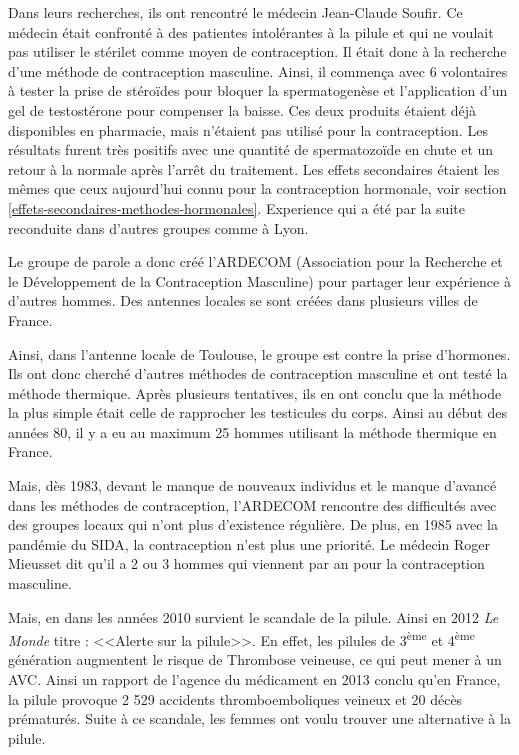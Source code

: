 \documentclass[12pt,a4paper]{report}
\begin{document}
Dans leurs recherches, ils ont rencontré le médecin Jean-Claude Soufir. \cites{guillaumedaudinContraceptesEnqueteDernier2022}{HistoriqueArdecom}
Ce médecin était confronté à des patientes intolérantes à la pilule et qui ne voulait pas utiliser le stérilet comme moyen de contraception.
Il était donc à la recherche d'une méthode de contraception masculine.
Ainsi, il commença avec 6 volontaires à tester la prise de stéroïdes pour bloquer la spermatogenèse et l'application d'un gel de testostérone pour compenser la baisse.
Ces deux produits étaient déjà disponibles en pharmacie, mais n'étaient pas utilisé pour la contraception. \cites{soufirReversibleInhibitionSperm1983}{bobikaCoeurZobs2022}
Les résultats furent très positifs avec une quantité de spermatozoïde en chute et un retour à la normale après l'arrêt du traitement.
Les effets secondaires étaient les mêmes que ceux aujourd'hui connu pour la contraception hormonale, voir section \ref{effets-secondaires-methodes-hormonales}. \cite{soufirReversibleInhibitionSperm1983}
Experience qui a été par la suite reconduite dans d'autres groupes comme à Lyon. \cite{ContraceptionSeDecline1982}

Le groupe de parole a donc créé l'ARDECOM (Association pour la Recherche et le Développement de la Contraception Masculine) pour partager leur expérience à d'autres hommes.
Des antennes locales se sont créées dans plusieurs villes de France. \cites{HistoriqueArdecom}{guillaumedaudinContraceptesEnqueteDernier2022}

Ainsi, dans l'antenne locale de Toulouse, le groupe est contre la prise d'hormones.
Ils ont donc cherché d'autres méthodes de contraception masculine et ont testé la méthode thermique.
Après plusieurs tentatives, ils en ont conclu que la méthode la plus simple était celle de rapprocher les testicules du corps. \cite{bobikaCoeurZobs2022}
Ainsi au début des années 80, il y a eu au maximum 25 hommes utilisant la méthode thermique en France. \cite{guillaumedaudinContraceptesEnqueteDernier2022}

Mais, dès 1983, devant le manque de nouveaux individus et le manque d'avancé dans les méthodes de contraception, l'ARDECOM rencontre des difficultés avec des groupes locaux qui n'ont plus d'existence régulière.
De plus, en 1985 avec la pandémie du SIDA, la contraception n'est plus une priorité.
Le médecin Roger Mieusset dit qu'il a 2 ou 3 hommes qui viennent par an pour la contraception masculine. \cite{guillaumedaudinContraceptesEnqueteDernier2022}

Mais, en dans les années 2010 survient le scandale de la pilule. Ainsi en 2012 \textit{Le Monde} titre : <<Alerte sur la pilule>>.
En effet, les pilules de 3\textsuperscript{ème} et 4\textsuperscript{ème} génération augmentent le risque de Thrombose veineuse, ce qui peut mener à un AVC.
Ainsi un rapport de l'agence du médicament en 2013 conclu qu'en France, la pilule provoque 2 529 accidents thromboemboliques veineux et 20 décès prématurés.
Suite à ce scandale, les femmes ont voulu trouver une alternative à la pilule. \cites{albrechtQuelleEstPlace2023}{guillaumedaudinContraceptesEnqueteDernier2022}{AlertePilule2012}
\end{document}
